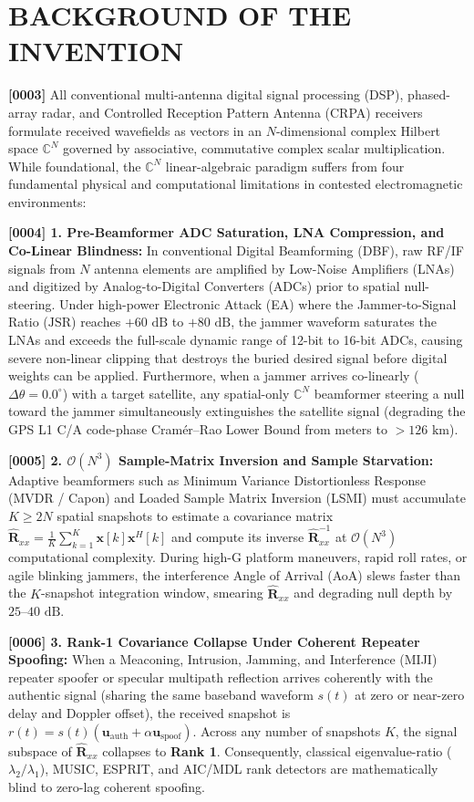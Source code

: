 \documentclass[12pt,letterpaper]{article}
\begin{document}
\section*{BACKGROUND OF THE INVENTION}
\textbf{[0003]} All conventional multi-antenna digital signal processing (DSP), phased-array radar, and Controlled Reception Pattern Antenna (CRPA) receivers formulate received wavefields as vectors in an $N$-dimensional complex Hilbert space $\mathbb{C}^N$ governed by associative, commutative complex scalar multiplication. While foundational, the $\mathbb{C}^N$ linear-algebraic paradigm suffers from four fundamental physical and computational limitations in contested electromagnetic environments:

\textbf{[0004] 1. Pre-Beamformer ADC Saturation, LNA Compression, and Co-Linear Blindness:} In conventional Digital Beamforming (DBF), raw RF/IF signals from $N$ antenna elements are amplified by Low-Noise Amplifiers (LNAs) and digitized by Analog-to-Digital Converters (ADCs) prior to spatial null-steering. Under high-power Electronic Attack (EA) where the Jammer-to-Signal Ratio ($\mathrm{JSR}$) reaches $+60\text{ dB}$ to $+80\text{ dB}$, the jammer waveform saturates the LNAs and exceeds the full-scale dynamic range of 12-bit to 16-bit ADCs, causing severe non-linear clipping that destroys the buried desired signal before digital weights can be applied. Furthermore, when a jammer arrives co-linearly ($\Delta\theta = 0.0^\circ$) with a target satellite, any spatial-only $\mathbb{C}^N$ beamformer steering a null toward the jammer simultaneously extinguishes the satellite signal (degrading the GPS L1 C/A code-phase Cram\'er--Rao Lower Bound from meters to $>126\text{ km}$).

\textbf{[0005] 2. $\mathcal{O}(N^3)$ Sample-Matrix Inversion and Sample Starvation:} Adaptive beamformers such as Minimum Variance Distortionless Response (MVDR / Capon) and Loaded Sample Matrix Inversion (LSMI) must accumulate $K \ge 2N$ spatial snapshots to estimate a covariance matrix $\hat{\mathbf{R}}_{xx} = \frac{1}{K}\sum_{k=1}^K \mathbf{x}[k]\mathbf{x}^H[k]$ and compute its inverse $\hat{\mathbf{R}}_{xx}^{-1}$ at $\mathcal{O}(N^3)$ computational complexity. During high-G platform maneuvers, rapid roll rates, or agile blinking jammers, the interference Angle of Arrival (AoA) slews faster than the $K$-snapshot integration window, smearing $\hat{\mathbf{R}}_{xx}$ and degrading null depth by $25\text{--}40\text{ dB}$.

\textbf{[0006] 3. Rank-1 Covariance Collapse Under Coherent Repeater Spoofing:} When a Meaconing, Intrusion, Jamming, and Interference (MIJI) repeater spoofer or specular multipath reflection arrives coherently with the authentic signal (sharing the same baseband waveform $s(t)$ at zero or near-zero delay and Doppler offset), the received snapshot is $r(t) = s(t)(\mathbf{u}_{\mathrm{auth}} + \alpha \mathbf{u}_{\mathrm{spoof}})$. Across any number of snapshots $K$, the signal subspace of $\hat{\mathbf{R}}_{xx}$ collapses to \textbf{Rank 1}. Consequently, classical eigenvalue-ratio ($\lambda_2/\lambda_1$), MUSIC, ESPRIT, and AIC/MDL rank detectors are mathematically blind to zero-lag coherent spoofing.
\end{document}
